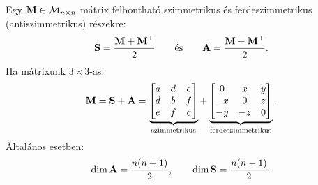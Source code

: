 \begin{note}
  Egy $\mathbf{M} \in \mathcal M_{n \times n}$ mátrix felbontható szimmetrikus és
  ferdeszimmetrikus (antiszimmetrikus) részekre:
  $$
    \mathbf{S} = \frac{\mathbf{M} + \mathbf{M}^\top}{2}
    \qquad\text{és}\qquad
    \mathbf{A} = \frac{\mathbf{M} - \mathbf{M}^\top}{2}
    \text.
  $$
  Ha mátrixunk $3 \times 3$-as:
  $$
    \mathbf{M}
    = \mathbf{S} + \mathbf{A}
    = \underbrace{\begin{bmatrix}
        a & d & e \\
        d & b & f \\
        e & f & c
      \end{bmatrix}}_{\text{szimmetrikus}}
    + \underbrace{\begin{bmatrix}
        0  & x  & y \\
        -x & 0  & z \\
        -y & -z & 0
      \end{bmatrix}}_{\text{ferdeszimmetrikus}}
    \text.
  $$
  Általános esetben:
  $$
    \dim \mathbf{A} = \frac{n(n + 1)}{2}
    \text,\qquad
    \dim \mathbf{S} = \frac{n(n - 1)}{2}
    \text.
  $$
\end{note}

